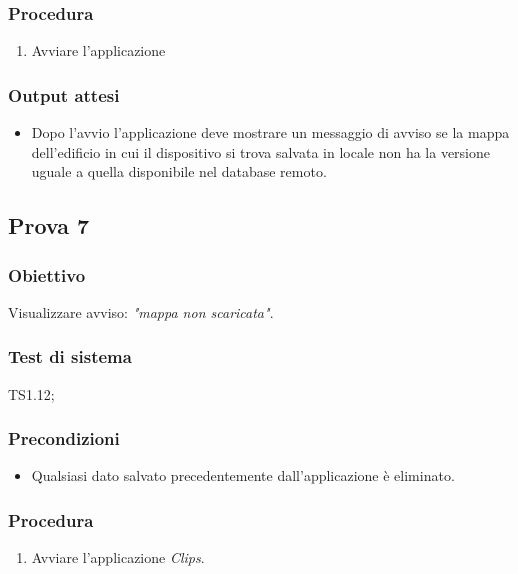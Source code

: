 \documentclass[../SperimentazioniPratiche.tex]{subfiles}
\begin{document}
	\subsubsection{Procedura}	
	
		\begin{enumerate}
		\item Avviare l'applicazione
		\end{enumerate}
		
	\subsubsection{Output attesi}
		\begin{itemize}
		\item Dopo l'avvio l'applicazione deve mostrare un messaggio di avviso se la mappa dell'edificio in cui il dispositivo si trova salvata in locale non ha la versione uguale a quella disponibile nel database remoto.
		\end{itemize}
	
	
	
\newpage	
\subsection{Prova 7} %
\label{subsec:Prova7}	
	
	\subsubsection{Obiettivo}
		Visualizzare avviso: \textit{"mappa non scaricata"}.
		
	\subsubsection{Test di sistema}
		TS1.12;
		
	\subsubsection{Precondizioni}
		\begin{itemize}
			\item Qualsiasi dato salvato precedentemente dall'applicazione è eliminato.
		\end{itemize}
		
	\subsubsection{Procedura}
		\begin{enumerate}
		\item Avviare l'applicazione \textit{Clips}.
		\end{enumerate}
		
\end{document}
